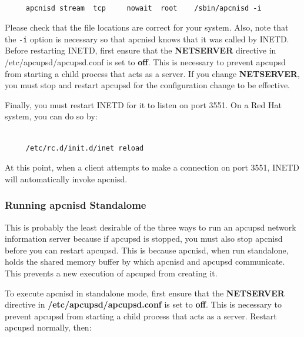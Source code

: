 {{{{{{{{{{\footnotesize
\begin{verbatim}
     
     apcnisd stream  tcp     nowait  root    /sbin/apcnisd -i
\end{verbatim}
\normalsize

Please check that the file locations are correct for your system. Also, note
that the {\tt -i} option is necessary so that apcnisd knows that it was called
by INETD. Before restarting INETD, first ensure that the {\bf NETSERVER}
directive in /etc/apcupsd/apcupsd.conf is set to {\bf off}. This is necessary
to prevent apcupsd from starting a child process that acts as a server. If you
change {\bf NETSERVER}, you must stop and restart apcupsd for the
configuration change to be effective.  

Finally, you must restart INETD for it to listen on port 3551. On a Red Hat
system, you can do so by: 

\footnotesize
\begin{verbatim}
     
     /etc/rc.d/init.d/inet reload
\end{verbatim}
\normalsize

At this point, when a client attempts to make a connection on port 3551, INETD
will automatically invoke apcnisd. 

\label{Running-apcnisd-Standalome}

\subsubsection*{Running apcnisd Standalome}

This is probably the least desirable of the three ways to run an apcupsd
network information server because if apcupsd is stopped, you must also stop
apcnisd before you can restart apcupsd. This is because apcnisd, when run
standalone, holds the shared memory buffer by which apcnisd and apcupsd
communicate. This prevents a new execution of apcupsd from creating it.  

To execute apcnisd in standalone mode, first ensure that the {\bf NETSERVER}
directive in {\bf /etc/apcupsd/apcupsd.conf} is set to {\bf off}. This is
necessary to prevent apcupsd from starting a child process that acts as a
server. Restart apcupsd normally, then: 

\footnotesize
\begin{verbatim}
     

\end{verbatim}}}}}}}}}}}
